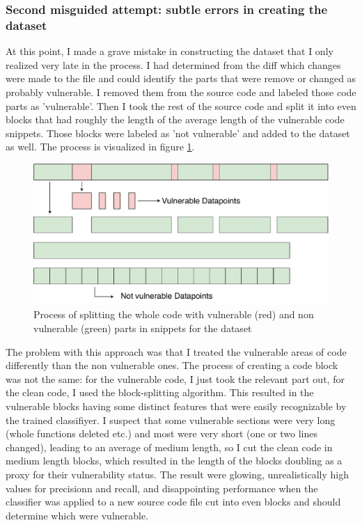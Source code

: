 \documentclass[
	a4paper,
	pagesize,
	pdftex,
	12pt,
	twoside, %
	BCOR=5mm, %
	ngerman,
	fleqn,
	final,
	]{scrartcl}
\begin{document}
\subsubsection{Second misguided attempt: subtle errors in creating the dataset}
At this point, I made a grave mistake in constructing the dataset that I only realized very late in the process. I had determined from the diff which changes were made to the file and could identify the parts that were remove or changed as probably vulnerable. I removed them from the source code and labeled those code parts as 'vulnerable'. Then I took the rest of the source code and split it into even blocks that had roughly the length of the average length of the vulnerable code snippets. Those blocks were labeled as 'not vulnerable' and added to the dataset as well. The process is visualized in figure \ref{fig:collectData1}.

\begin{figure}[ht]
	\centering
	\includegraphics[width=\linewidth]{img/collectData1}
	\caption{Process of splitting the whole code with vulnerable (red) and non vulnerable (green) parts in snippets for the dataset}
	\label{fig:collectData1}
\end{figure}

The problem with this approach was that I treated the vulnerable areas of code differently than the non vulnerable ones. The process of creating a code block was not the same: for the vulnerable code, I just took the relevant part out, for the clean code, I used the block-splitting algorithm. This resulted in the vulnerable blocks having some distinct features that were easily recognizable by the trained classifiyer. I suspect that some vulnerable sections were very long (whole functions deleted etc.) and most were very short (one or two lines changed), leading to an average of medium length, so I cut the clean code in medium length blocks, which resulted in the length of the blocks doubling as a proxy for their vulnerability status. The result were glowing, unrealistically high values for precisionn and recall, and disappointing performance when the classifier was applied to a new source code file cut into even blocks and should determine which were vulnerable.\\
\end{document}
